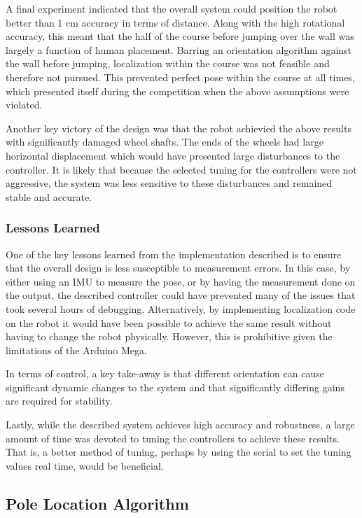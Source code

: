 \documentclass[ece]{uw-wkrpt}
\begin{document}
A final experiment indicated that the overall system could position the robot better than 1 cm accuracy in terms of distance. Along with the high rotational accuracy, this meant that the half of the course before jumping over the wall was largely a function of human placement. Barring an orientation algorithm against the wall before jumping, localization within the course was not feasible and therefore not pursued. This prevented perfect pose within the course at all times, which presented itself during the competition when the above assumptions were violated. 

Another key victory of the design was that the robot achievied the above results with significantly damaged wheel shafts. The ends of the wheels had large horizontal displacement which would have presented large disturbances to the controller. It is likely that because the selected tuning for the controllers were not aggressive, the system was less sensitive to these disturbances and remained stable and accurate.

\subsubsection{Lessons Learned}

One of the key lessons learned from the implementation described is to ensure that the overall design is less susceptible to measurement errors. In this case, by either using an IMU to measure the pose, or by having the measurement done on the output, the described controller could have prevented many of the issues that took several hours of debugging. Alternatively, by implementing localization code on the robot it would have been possible to achieve the same result without having to change the robot physically. However, this is prohibitive given the limitations of the Arduino Mega. 

In terms of control, a key take-away is that different orientation can cause significant dynamic changes to the system and that significantly differing gains are required for stability. 

Lastly, while the described system achieves high accuracy and robustness, a large amount of time was devoted to tuning the controllers to achieve these results. That is, a better method of tuning, perhaps by using the serial to set the tuning values real time, would be beneficial. 

\subsection{Pole Location Algorithm}
\end{document}
